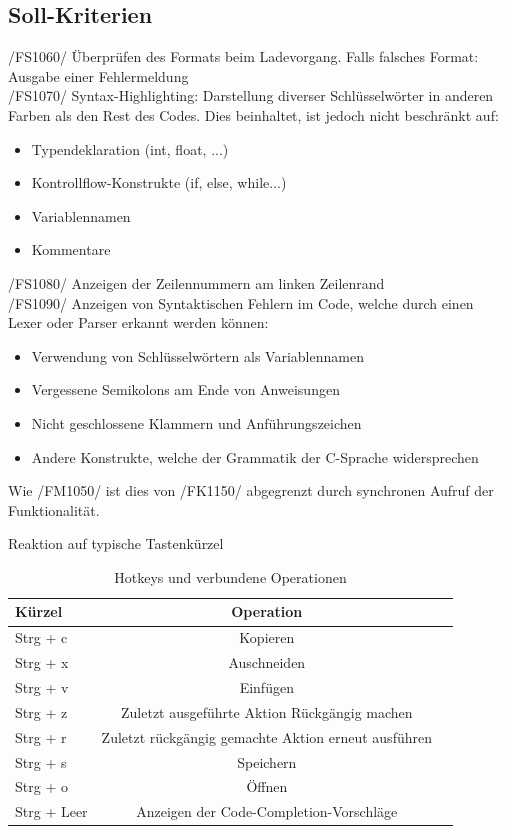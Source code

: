 \documentclass[a4paper]{scrreprt}
\begin{document}
\subsection{Soll-Kriterien}
/FS1060/ Überprüfen des Formats beim Ladevorgang. Falls falsches Format: Ausgabe einer Fehlermeldung \\
/FS1070/ Syntax-Highlighting: Darstellung diverser Schlüsselwörter in anderen Farben als den Rest des Codes. Dies beinhaltet, ist jedoch nicht beschränkt auf: 
\begin{itemize}
\item Typendeklaration (int, float, ...)
\item Kontrollflow-Konstrukte (if, else, while...)
\item Variablennamen
\item Kommentare
\end{itemize}
/FS1080/ Anzeigen der Zeilennummern am linken Zeilenrand \\
/FS1090/ Anzeigen von Syntaktischen Fehlern im Code, welche durch einen Lexer oder Parser erkannt werden können: 
\begin{itemize}
\item Verwendung von Schlüsselwörtern als Variablennamen 
\item Vergessene Semikolons am Ende von Anweisungen
\item Nicht geschlossene Klammern und Anführungszeichen
\item Andere Konstrukte, welche der Grammatik der C-Sprache widersprechen
\end{itemize}
Wie /FM1050/ ist dies von /FK1150/ abgegrenzt durch synchronen Aufruf der Funktionalität.

Reaktion auf typische Tastenkürzel\\
\begin{table}[H]
\caption{Hotkeys und verbundene Operationen}
\begin{tabular}{lcr} 
Kürzel & Operation \\
\hline 
Strg + c & Kopieren \\
Strg + x & Auschneiden \\
Strg + v & Einfügen \\
Strg + z & Zuletzt ausgeführte Aktion Rückgängig machen \\
Strg + r & Zuletzt rückgängig gemachte Aktion erneut ausführen \\
Strg + s & Speichern \\
Strg + o & Öffnen \\
Strg + Leer & Anzeigen der Code-Completion-Vorschläge\\
\end{tabular}
\label{table:Hotkeys_and_operations}
\end{table}
\end{document}
